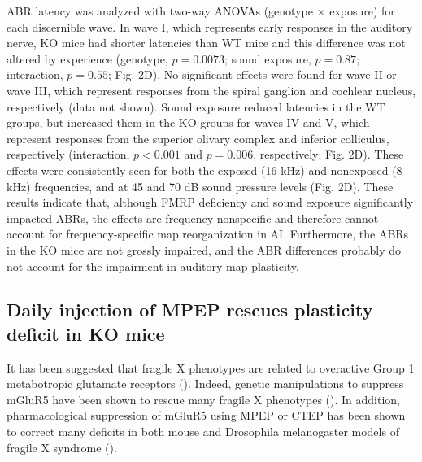 ABR latency was analyzed with two-way ANOVAs (genotype $\times$ exposure) for each discernible wave. In wave I, which represents early responses in the auditory nerve, KO mice had shorter latencies than WT mice and this difference was not altered by experience (genotype, $p=0.0073$; sound exposure, $p=0.87$; interaction, $p=0.55$; Fig. 2D). No significant effects were found for wave II or wave III, which represent responses from the spiral ganglion and cochlear nucleus, respectively (data not shown). Sound exposure reduced latencies in the WT groups, but increased them in the KO groups for waves IV and V, which represent responses from the superior olivary complex and inferior colliculus, respectively (interaction, $p<0.001$ and $p=0.006$, respectively; Fig. 2D). These effects were consistently seen for both the exposed (16 kHz) and nonexposed (8 kHz) frequencies, and at 45 and 70 dB sound pressure levels (Fig. 2D). These results indicate that, although FMRP deficiency and sound exposure significantly impacted ABRs, the effects are frequency-nonspecific and therefore cannot account for frequency-specific map reorganization in AI. Furthermore, the ABRs in the KO mice are not grossly impaired, and the ABR differences probably do not account for the impairment in auditory map plasticity.

\subsection{Daily injection of MPEP rescues plasticity deficit in KO mice}

It has been suggested that fragile X phenotypes are related to overactive Group 1 metabotropic glutamate receptors (\cite{Bear2004}). Indeed, genetic manipulations to suppress mGluR5 have been shown to rescue many fragile X phenotypes (\cite{Dolen2007}). In addition, pharmacological suppression of mGluR5 using MPEP or CTEP has been shown to correct many deficits in both mouse and Drosophila melanogaster models of fragile X syndrome (\cite{McBride2005, Yan2005, DeVrij2008, Meredith2011, Su2011, Michalon2012, Thomas2012}).


